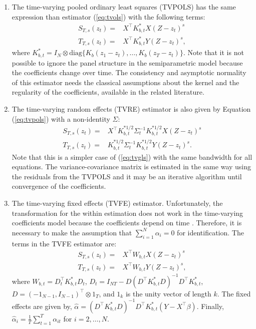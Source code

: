 \begin{enumerate}
\item The time-varying pooled ordinary least squares (TVPOLS) has the same expression than estimator (\ref{eq:tvols}) with the following terms:
\begin{align}
S_{T, s}(z_t) = & X^{\top} K_{b,t}^* X (Z - z_t)^s \nonumber\\
T_{T, s}(z_t) = &X^{\top} K_{b,t}^* Y (Z - z_t)^s,
\label{eq:tvpols}
\end{align}
where $K_{b, t}^*=  I_N \otimes \mbox{diag}\{K_b(z_1-z_t),\ldots, K_b(z_T-z_t)\}$. Note that it is not possible to ignore the panel structure in the semiparametric model because the coefficients change over time. The consistency and asymptotic normality of this estimator needs the classical assumptions about the kernel and the regularity of the coefficients, available in the related literature. 
\item The time-varying random effects (TVRE) estimator is also given by Equation (\ref{eq:tvpols}) with a non-identity $\Sigma$:
\begin{align}
S_{T, s}(z_t) = &X^{\top} K_{b,t}^{*1/2} \Sigma_t^{-1} K_{b,t}^{*1/2} X (Z - z_t)^s \nonumber\\
T_{T, s}(z_t) = &K_{b,t}^{*1/2} \Sigma_t^{-1} K_{b,t}^{*1/2}Y(Z - z_t)^s.
\label{eq:tvRE}
\end{align}
Note that this is a simpler case of (\ref{eq:tvgls}) with the same bandwidth for all equations. The variance-covariance matrix is estimated in the same way using the residuals from the TVPOLS and it may be an iterative algorithm until convergence of the coefficients.
\item The time-varying fixed effects (TVFE) estimator. Unfortunately, the transformation for the within estimation does not work in the time-varying coefficients model because the coefficients depend on time \citep[][explain the issue in detail]{Sunetal2009}. Therefore, it is necessary to make the assumption that  $\sum_{i=1}^N \alpha_i=0$ for identification. The terms in the TVFE estimator are:
\begin{align}
S_{T, s}(z_t) = &X^{\top} W_{b,t} X (Z - z_t)^s \nonumber\\
T_{T, s}(z_t) = &X^{\top} W_{b,t} Y (Z - z_t)^s,
\label{eq:tvFE}
\end{align}
where $W_{b,t}=D_{t}^\top K_{b, t}^*D_{t}$, $D_{t}=I_{NT} -  D(D^\top K_{b, t}^* D)^{-1} D^\top K_{b,t}^*$, $D=(-1_{N-1},I_{N-1})^\top \otimes 1_T$, and $1_k$ is the unity vector of length $k$. The fixed effects are given by, $\hat \alpha = (D^\top K_{b,t}^*D)^{-1}D^\top K_{b,t}^*(Y - X^\top \beta)$. Finally, $\hat \alpha_i = \frac{1}{T} \sum_{t=1}^T \alpha_{it}$ for $i= 2, \ldots, N$.
\end{enumerate}


